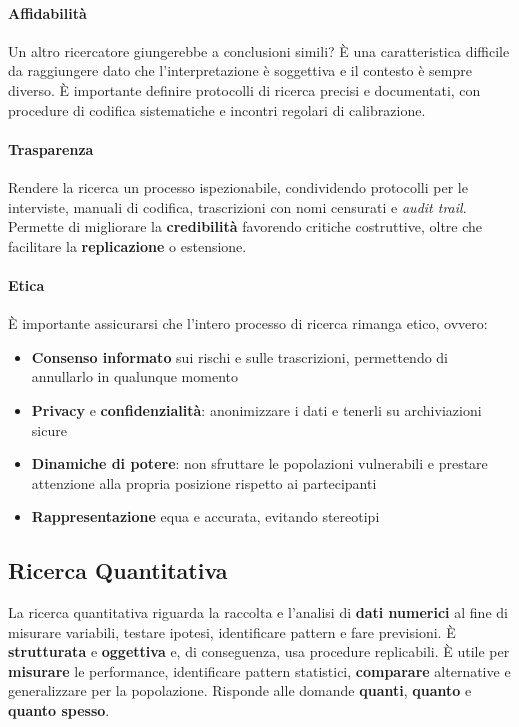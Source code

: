 \paragraph{Affidabilità} Un altro ricercatore giungerebbe a conclusioni simili? È una caratteristica difficile da raggiungere dato che l'interpretazione è soggettiva e il contesto è sempre diverso. È importante definire protocolli di ricerca precisi e documentati, con procedure di codifica sistematiche e incontri regolari di calibrazione.

\paragraph{Trasparenza} Rendere la ricerca un processo ispezionabile, condividendo protocolli per le interviste, manuali di codifica, trascrizioni con nomi censurati e \textit{audit trail}. Permette di migliorare la \textbf{credibilità} favorendo critiche costruttive, oltre che facilitare la \textbf{replicazione} o estensione.

\paragraph{Etica} È importante assicurarsi che l'intero processo di ricerca rimanga etico, ovvero:
\begin{itemize}
	\item \textbf{Consenso informato} sui rischi e sulle trascrizioni, permettendo di annullarlo in qualunque momento
	\item \textbf{Privacy} e \textbf{confidenzialità}: anonimizzare i dati e tenerli su archiviazioni sicure
	\item \textbf{Dinamiche di potere}: non sfruttare le popolazioni vulnerabili e prestare attenzione alla propria posizione rispetto ai partecipanti
	\item \textbf{Rappresentazione} equa e accurata, evitando stereotipi
\end{itemize}

\subsection{Ricerca Quantitativa}
La ricerca quantitativa riguarda la raccolta e l'analisi di \textbf{dati numerici} al fine di misurare variabili, testare ipotesi, identificare pattern e fare previsioni. È \textbf{strutturata} e \textbf{oggettiva} e, di conseguenza, usa procedure replicabili. È utile per \textbf{misurare} le performance, identificare pattern statistici, \textbf{comparare} alternative e generalizzare per la popolazione. Risponde alle domande \textbf{quanti}, \textbf{quanto} e \textbf{quanto spesso}.

